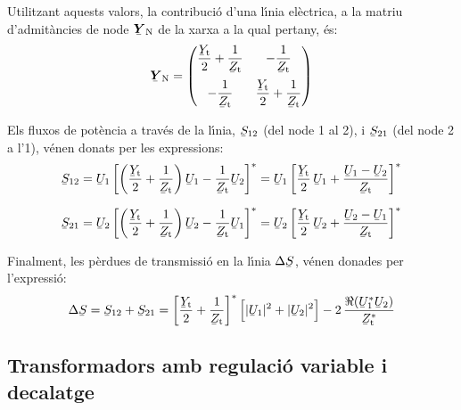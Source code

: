 Utilitzant aquests valors, la contribuci\'{o} d'una l\'{\i}nia el\`{e}ctrica, a
la matriu d'admit\`{a}ncies de node $\mcmplx{Y}\ped{N}$ de la xarxa a la
qual pertany, \'{e}s: 
\begin{equation}
   \mcmplx{Y}\ped{N} = \begin{pmatrix}
     \dfrac{\cmplx{Y}\ped{t}}{2} + \dfrac{1}{\cmplx{Z}\ped{t}} & -\dfrac{1}{\cmplx{Z}\ped{t}}\\[2.5ex]
     -\dfrac{1}{\cmplx{Z}\ped{t}} & \dfrac{\cmplx{Y}\ped{t}}{2} + \dfrac{1}{\cmplx{Z}\ped{t}}
   \end{pmatrix}
\end{equation}

Els fluxos de pot\`{e}ncia a trav\'{e}s de la l\'{\i}nia, $\cmplx{S}_{12}$ (del
node 1 al 2), i $\cmplx{S}_{21}$ (del node 2 a l'1), v\'{e}nen donats
per les expressions:
\begin{align}
   \cmplx{S}_{12} &= \cmplx{U}_1 \left[ \left( \frac{\cmplx{Y}\ped{t}}{2} + \frac{1}{\cmplx{Z}\ped{t}} \right) \cmplx{U}_1 - \frac{1}{\cmplx{Z}\ped{t}} \cmplx{U}_2 \right]^* = \cmplx{U}_1 \left[ \frac{\cmplx{Y}\ped{t}}{2}\, \cmplx{U}_1 + \frac{\cmplx{U}_1 - \cmplx{U}_2}{\cmplx{Z}\ped{t}} \right]^* \label{eq:lin_s12}
   \\[1.5ex]
   \cmplx{S}_{21} &= \cmplx{U}_2 \left[ \left( \frac{\cmplx{Y}\ped{t}}{2} + \frac{1}{\cmplx{Z}\ped{t}} \right) \cmplx{U}_2 - \frac{1}{\cmplx{Z}\ped{t}} \cmplx{U}_1 \right]^* = \cmplx{U}_2 \left[ \frac{\cmplx{Y}\ped{t}}{2} \,\cmplx{U}_2 + \frac{\cmplx{U}_2 - \cmplx{U}_1}{\cmplx{Z}\ped{t}} \right]^* \label{eq:lin_s21}
\end{align}

Finalment, les p\`{e}rdues de transmissi\'{o} en la  l\'{\i}nia
$\Delta\cmplx{S}$, v\'{e}nen donades per
l'expressi\'{o}:
\begin{equation}
   \Delta\cmplx{S} = \cmplx{S}_{12} + \cmplx{S}_{21} = \left[ \frac{\cmplx{Y}\ped{t}}{2} + \frac{1}{\cmplx{Z}\ped{t}} \right]^* \Big[ |\cmplx{U}_1|^2 + |\cmplx{U}_2|^2 \Big] - 2 \, \frac{\Re (\cmplx{U}_1^* \cmplx{U}_2)}{\cmplx{Z}\ped{t}^*}
\end{equation}

\subsection{Transformadors amb regulaci\'{o} variable i decalatge}

